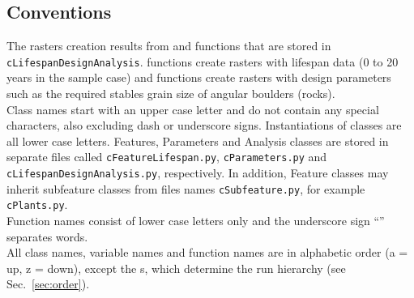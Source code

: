 \subsection{Conventions}
The rasters creation results from  and  functions that are stored in \texttt{cLifespanDesignAnalysis}.  functions create rasters with lifespan data (0 to 20 years in the sample case) and  functions create rasters with design parameters such as the required stables grain size of angular boulders (rocks).\\
Class names start with an upper case letter and do not contain any special characters, also excluding dash or underscore signs. Instantiations of classes are all lower case letters. Features, Parameters and Analysis classes are stored in separate files called \texttt{cFeatureLifespan.py}, \texttt{cParameters.py} and \texttt{cLifespanDesignAnalysis.py}, respectively. In addition, Feature classes may inherit subfeature classes from files names \texttt{cSubfeature.py}, for example \texttt{cPlants.py}.\\
Function names consist of lower case letters only and the underscore sign ``{\myUnderscore}'' separates words.\\
All class names, variable names and function names are in alphabetic order (a = up, z = down), except the s, which determine the run hierarchy (see Sec.~\ref{sec:order}).

